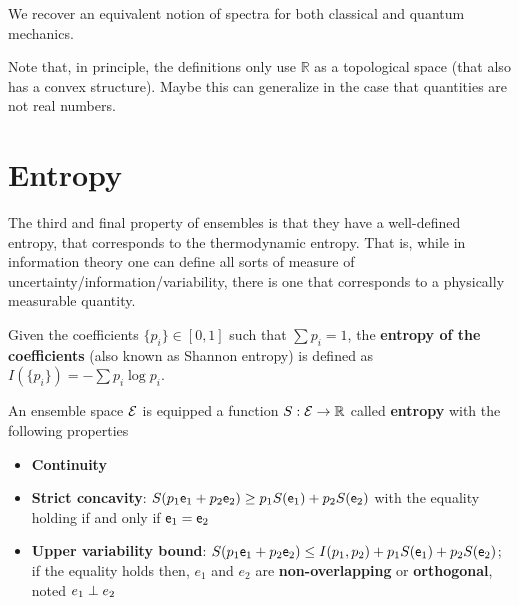 \begin{prop}
	
\end{prop}

\begin{conj}
	We recover an equivalent notion of spectra for both classical and quantum mechanics.
\end{conj}

Note that, in principle, the definitions only use $\mathbb{R}$ as a topological space (that also has a convex structure). Maybe this can generalize in the case that quantities are not real numbers.

\section{Entropy}

The third and final property of ensembles is that they have a well-defined entropy, that corresponds to the thermodynamic entropy. That is, while in information theory one can define all sorts of measure of uncertainty/information/variability, there is one that corresponds to a physically measurable quantity.

\begin{defn}
	Given the coefficients $\{p_i\} \in [0,1]$ such that $\sum p_i = 1$, the \textbf{entropy of the coefficients} (also known as Shannon entropy) is defined as $I(\{p_i\}) = - \sum p_i \log p_i $.
\end{defn}

\begin{axiom}
	An ensemble space $\mathcal{E}$ is equipped a function $S : \mathcal{E} \to \mathbb{R}$ called \textbf{entropy} with the following properties
	\begin{itemize}
		\item \textbf{Continuity}
		\item \textbf{Strict concavity}: $S(p_1\mathsf{e}_1 + p_2 \mathsf{e}_2) \geq p_1 S(\mathsf{e}_1) + p_2 S(\mathsf{e}_2)$ with the equality holding if and only if $\mathsf{e}_1 = \mathsf{e}_2$
		\item \textbf{Upper variability bound}: $S(p_1\mathsf{e}_1 + p_2 \mathsf{e}_2) \leq I(p_1, p_2) + p_1 S(\mathsf{e}_1) + p_2 S(\mathsf{e}_2)$; if the equality holds then, $e_1$ and $e_2$ are \textbf{non-overlapping} or \textbf{orthogonal}, noted $e_1 \perp e_2$
	\end{itemize}
\end{axiom}

